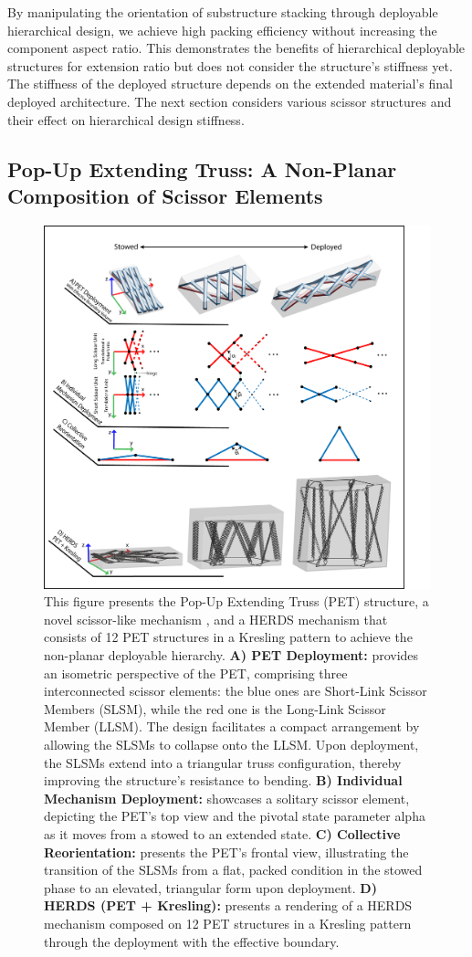 By manipulating the orientation of substructure stacking through {deployable }hierarchical design, we achieve high packing efficiency without increasing the component aspect ratio. This demonstrates the benefits of hierarchical deployable structures for extension ratio but does not consider the structure's stiffness yet. The stiffness of the deployed structure depends on the extended material's final deployed architecture. The next section considers various scissor structures and their effect on hierarchical design stiffness.

\subsection{Pop-Up Extending Truss: A Non-Planar Composition of Scissor Elements}
\begin{figure}
\centering
\includegraphics[width=0.9\linewidth]{Figures/Rebuttal/figure2_PET_reorientation_rebuttal.png}
\centering
\caption{This figure presents the Pop-Up Extending Truss (PET) structure, a novel scissor-like mechanism {, and a HERDS mechanism that consists of 12 PET structures in a Kresling pattern to achieve the non-planar deployable hierarchy}. \textbf{A) PET Deployment:} provides an isometric perspective of the PET, comprising three interconnected scissor elements: the blue ones are Short-Link Scissor Members (SLSM), while the red one is the Long-Link Scissor Member (LLSM). The design facilitates a compact arrangement by allowing the SLSMs to collapse onto the LLSM. Upon deployment, the SLSMs extend into a triangular truss configuration, thereby improving the structure’s resistance to bending. \textbf{B) Individual Mechanism Deployment:} showcases a solitary scissor element, depicting the PET’s top view and the pivotal state parameter alpha as it moves from a stowed to an extended state. \textbf{C) Collective Reorientation:} presents the PET’s frontal view, illustrating the transition of the SLSMs from a flat, packed condition in the stowed phase to an elevated, triangular form upon deployment. {\textbf{D) HERDS (PET + Kresling):} presents a rendering of a HERDS mechanism composed on 12 PET structures in a Kresling pattern through the deployment with the effective boundary.}}\label{fig:PET_expansion}

\end{figure}
